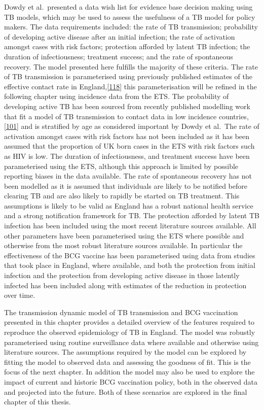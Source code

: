 \documentclass[11pt,twoside]{bristolthesis}
\begin{document}
  Dowdy et al.~presented a data wish list for evidence base decision making using TB models, which may be used to assess the usefulness of a TB model for policy makers. The data requirements included: the rate of TB transmission; probability of developing active disease after an initial infection; the rate of activation amongst cases with risk factors; protection afforded by latent TB infection; the duration of infectiousness; treatment success; and the rate of spontaneous recovery. The model presented here fulfills the majority of these criteria. The rate of TB transmission is parameterised using previously published estimates of the effective contact rate in England,{[}\protect\hyperlink{ref-Vynnycky1999}{118}{]} this parameterisation will be refined in the following chapter using incidence data from the ETS. The probability of developing active TB has been sourced from recently published modelling work that fit a model of TB transmission to contact data in low incidence countries,{[}\protect\hyperlink{ref-Ragonnet2017}{101}{]} and is stratified by age as considered important by Dowdy et al.~The rate of activation amongst cases with risk factors has not been included as it has been assumed that the proportion of UK born cases in the ETS with risk factors such as HIV is low. The duration of infectiousness, and treatment success have been parameterised using the ETS, although this approach is limited by possible reporting biases in the data available. The rate of spontaneous recovery has not been modelled as it is assumed that individuals are likely to be notified before clearing TB and are also likely to rapidly be started on TB treatment. This assumptions is likely to be valid as England has a robust national health service and a strong notification framework for TB. The protection afforded by latent TB infection has been included using the most recent literature sources available. All other parameters have been parameterised using the ETS where possible and otherwise from the most robust literature sources available. In particular the effectiveness of the BCG vaccine has been parameterised using data from studies that took place in England, where available, and both the protection from initial infection and the protection from developing active disease in those latently infected has been included along with estimates of the reduction in protection over time.
  
  The transmission dynamic model of TB transmission and BCG vaccination presented in this chapter provides a detailed overview of the features required to reproduce the observed epidemiology of TB in England. The model was robustly parameterised using routine surveillance data where available and otherwise using literature sources. The assumptions required by the model can be explored by fitting the model to observed data and assessing the goodness of fit. This is the focus of the next chapter. In addition the model may also be used to explore the impact of current and historic BCG vaccination policy, both in the observed data and projected into the future. Both of these scenarios are explored in the final chapter of this thesis.
  
\end{document}
